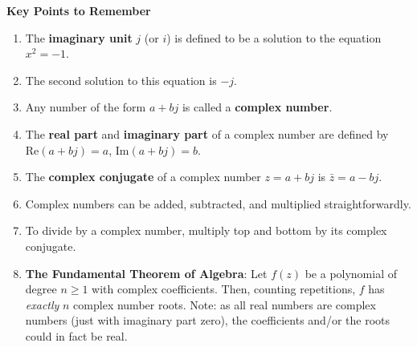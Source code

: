 \documentclass{article}
\begin{document}
\clearpage


{\bf Key Points to Remember}

\vspace{5mm}

\begin{enumerate}
\item The \textbf{imaginary unit} $j$ (or $i$) is defined to be a solution to the equation $x^2=-1$.
\item The second solution to this equation is $-j$.
\item Any number of the form $a+bj$ is called a \textbf{complex number}.
\item The \textbf{real part} and \textbf{imaginary part} of a complex number are defined by $\mathrm{Re}(a+bj)=a$, $\mathrm{Im}(a+bj)=b$.
\item The \textbf{complex conjugate} of a complex number $z=a+bj$ is $\bar{z}=a-bj$.
\item Complex numbers can be added, subtracted, and multiplied straightforwardly.
\item To divide by a complex number, multiply top and bottom by its complex conjugate.
\item \textbf{The Fundamental Theorem of Algebra}: Let $f(z)$ be a polynomial of degree $n\geq 1$ with complex coefficients. Then, counting repetitions, $f$ has \textit{exactly} $n$ complex number roots. Note: as all real numbers are complex numbers (just with imaginary part zero), the coefficients and/or the roots could in fact be real.
\end{enumerate}
\end{document}
